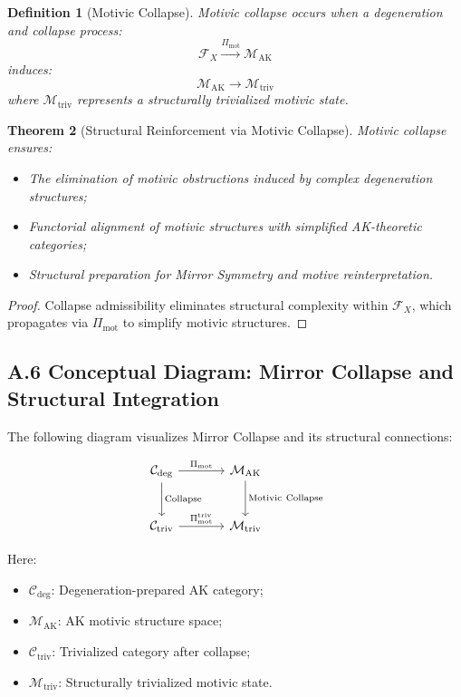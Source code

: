 \documentclass[11pt]{article}
\newtheorem{theorem}{Theorem}[section]
\newtheorem{definition}[theorem]{Definition}
\begin{document}
\begin{definition}[Motivic Collapse]
Motivic collapse occurs when a degeneration and collapse process:
\[
\mathcal{F}_X \xrightarrow{\Pi_{\mathrm{mot}}} \mathcal{M}_{\mathrm{AK}}
\]
induces:
\[
\mathcal{M}_{\mathrm{AK}} \longrightarrow \mathcal{M}_{\mathrm{triv}}
\]
where $\mathcal{M}_{\mathrm{triv}}$ represents a structurally trivialized motivic state.
\end{definition}

\begin{theorem}[Structural Reinforcement via Motivic Collapse]
Motivic collapse ensures:
\begin{itemize}
    \item The elimination of motivic obstructions induced by complex degeneration structures;
    \item Functorial alignment of motivic structures with simplified AK-theoretic categories;
    \item Structural preparation for Mirror Symmetry and motive reinterpretation.
\end{itemize}
\end{theorem}

\begin{proof}
Collapse admissibility eliminates structural complexity within $\mathcal{F}_X$, which propagates via $\Pi_{\mathrm{mot}}$ to simplify motivic structures.
\end{proof}

\subsection*{A.6 Conceptual Diagram: Mirror Collapse and Structural Integration}

The following diagram visualizes Mirror Collapse and its structural connections:

\[
\begin{tikzcd}[row sep=large, column sep=large]
\mathcal{C}_{\mathrm{deg}} \arrow[r, "\Pi_{\mathrm{mot}}"] \arrow[d, "\mathrm{Collapse}"]
& \mathcal{M}_{\mathrm{AK}} \arrow[d, "\mathrm{Motivic\ Collapse}"] \\
\mathcal{C}_{\mathrm{triv}} \arrow[r, "\Pi_{\mathrm{mot}}^{\mathrm{triv}}"]
& \mathcal{M}_{\mathrm{triv}}
\end{tikzcd}
\]

Here:

\begin{itemize}
    \item $\mathcal{C}_{\mathrm{deg}}$: Degeneration-prepared AK category;
    \item $\mathcal{M}_{\mathrm{AK}}$: AK motivic structure space;
    \item $\mathcal{C}_{\mathrm{triv}}$: Trivialized category after collapse;
    \item $\mathcal{M}_{\mathrm{triv}}$: Structurally trivialized motivic state.
\end{itemize}
\end{document}
